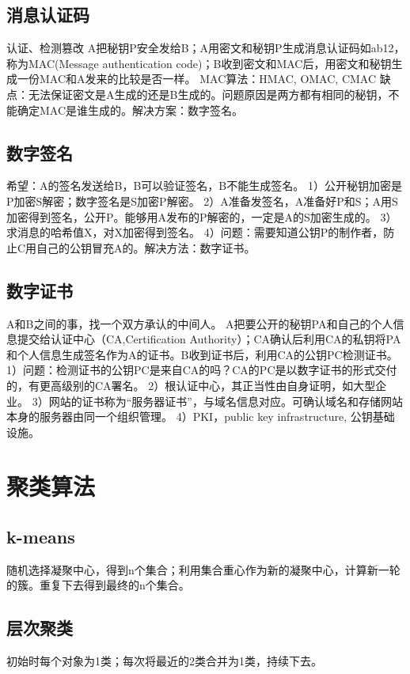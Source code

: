 \documentclass[UTF8]{../computerUniverse}
\begin{document}
\subsection{消息认证码}
认证、检测篡改
A把秘钥P安全发给B；A用密文和秘钥P生成消息认证码如ab12，称为MAC(Message authentication code)；B收到密文和MAC后，用密文和秘钥生成一份MAC和A发来的比较是否一样。
MAC算法：HMAC, OMAC, CMAC
缺点：无法保证密文是A生成的还是B生成的。问题原因是两方都有相同的秘钥，不能确定MAC是谁生成的。解决方案：数字签名。


\subsection{数字签名}
希望：A的签名发送给B，B可以验证签名，B不能生成签名。
1）公开秘钥加密是P加密S解密；数字签名是S加密P解密。
2）A准备发签名，A准备好P和S；A用S加密得到签名，公开P。能够用A发布的P解密的，一定是A的S加密生成的。
3）求消息的哈希值X，对X加密得到签名。
4）问题：需要知道公钥P的制作者，防止C用自己的公钥冒充A的。解决方法：数字证书。


\subsection{数字证书}
A和B之间的事，找一个双方承认的中间人。
A把要公开的秘钥PA和自己的个人信息提交给认证中心（CA,Certification Authority）；CA确认后利用CA的私钥将PA和个人信息生成签名作为A的证书。B收到证书后，利用CA的公钥PC检测证书。
1）问题：检测证书的公钥PC是来自CA的吗？CA的PC是以数字证书的形式交付的，有更高级别的CA署名。
2）根认证中心，其正当性由自身证明，如大型企业。
3）网站的证书称为“服务器证书”，与域名信息对应。可确认域名和存储网站本身的服务器由同一个组织管理。
4）PKI，public key infrastructure, 公钥基础设施。



\section{聚类算法}

\subsection{k-means}
随机选择凝聚中心，得到n个集合；利用集合重心作为新的凝聚中心，计算新一轮的簇。重复下去得到最终的n个集合。

\subsection{层次聚类}
初始时每个对象为1类；每次将最近的2类合并为1类，持续下去。
\end{document}
